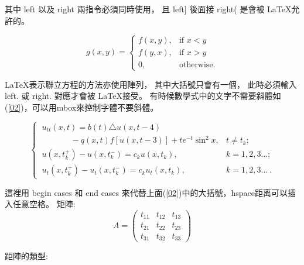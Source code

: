 其中 \A left 以及 \A right 兩指令必須同時使用， 且 \A left] 後面接 \A right( 是會被 \LaTeX 允許的。

\begin{equation}\label{02}
g(x,y) = \left\{\begin{array}{ll}
                 f(x,y), & \mbox{if $x<y$} \\  
                 f(y,x), & \mbox{if $x>y$} \\  
                 0,      & \mbox{otherwise.}
                \end{array} \right.
\end{equation}

\LaTeX 表示聯立方程的方法亦使用陣列， 其中大括號只會有一個， 此時必須輸入 \A left. 或 \A right. 對應才會被 \LaTeX 接受。
有時候數學式中的文字不需要斜體如(\ref{02})，可以用mbox來控制字體不要斜體。


\begin{equation}
\begin{cases}
 \ u_{tt}(x,t)= b(t)\triangle u(x,t-4)&\\
\ \hspace{42pt}- q(x,t)f[u(x,t-3)]+te^{-t}\sin^2 x,  &  t \neq t_k; \\
 \ u(x,t_k^+) - u(x,t_k^-) = c_k u(x,t_k), & k=1,2,3\ldots ;\\
 \ u_{t}(x,t_k^+) - u_{t}(x,t_k^-) =c_k u_{t}(x,t_k), &
 k=1,2,3\ldots\ .
\end{cases}
\end{equation}

這裡用 begin cases 和 end cases 來代替上面(\ref{02})中的大括號，hspace{距离}可以插入任意空格。
\bigskip
矩陣:
\begin{equation}
A =
\begin{pmatrix}              
  t_{11} & t_{12} & t_{13} \\
  t_{21} & t_{22} & t_{23} \\
  t_{31} & t_{32} & t_{33}
\end{pmatrix}
\end{equation}

距陣的類型:

